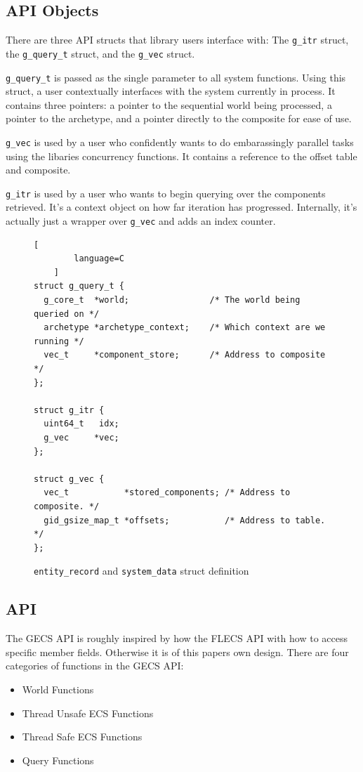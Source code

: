 \subsection{API Objects}
There are three API structs that library users interface with: The \texttt{g\_itr} struct, the \texttt{g\_query\_t} struct, and the \texttt{g\_vec} struct. 

\texttt{g\_query\_t} is passed as the single parameter to all system functions. Using this struct, a user contextually interfaces with the system currently in process. It contains three pointers: a pointer to the sequential world being processed, a pointer to the archetype, and a pointer directly to the composite for ease of use.

\texttt{g\_vec} is used by a user who confidently wants to do embarassingly parallel tasks using the libaries concurrency functions. It contains a reference to the offset table and composite.

\texttt{g\_itr} is used by a user who wants to begin querying over the components retrieved. It's a context object on how far iteration has progressed. Internally, it's actually just a wrapper over \texttt{g\_vec} and adds an index counter.

\begin{figure}[htbp]
    \begin{lstlisting}[
        language=C
    ]
struct g_query_t {
  g_core_t  *world;                /* The world being queried on */
  archetype *archetype_context;    /* Which context are we running */
  vec_t     *component_store;      /* Address to composite */
};
        
struct g_itr {
  uint64_t   idx;
  g_vec     *vec;
};

struct g_vec {
  vec_t           *stored_components; /* Address to composite. */
  gid_gsize_map_t *offsets;           /* Address to table. */
};
    \end{lstlisting}
    \caption{\texttt{entity\_record} and \texttt{system\_data} struct definition}
    \label{code:apis}
\end{figure}

\subsection{API}
The GECS API is roughly inspired by how the FLECS API with how to access specific member fields. Otherwise it is of this papers own design. There are four categories of functions in the GECS API:
\begin{itemize}
    \item World Functions
    \item Thread Unsafe ECS Functions
    \item Thread Safe ECS Functions
    \item Query Functions
\end{itemize}

